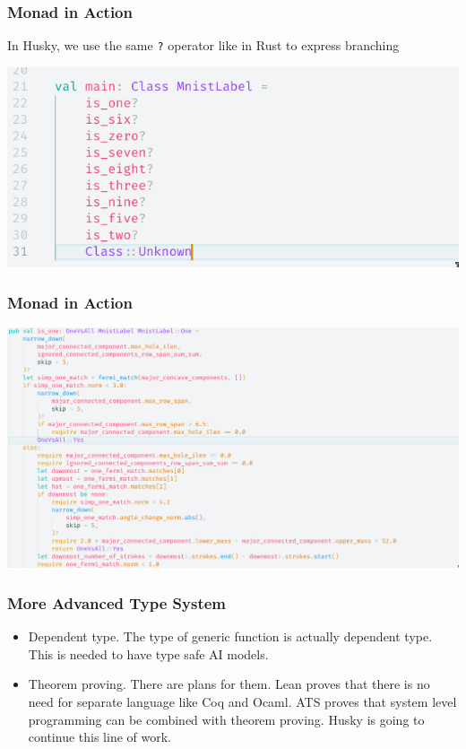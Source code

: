 \documentclass{beamer}   	%
\theoremstyle{definition}
\newcommand{\rust}[1]{\texttt{#1}}
\begin{document}
\begin{frame}
\frametitle{Monad in Action}

In Husky, we use the same \rust{?} operator like in Rust to express branching

\includegraphics[width=\linewidth]{snapshots/husky_mnist_classifier_main.png}
\end{frame}

\begin{frame}
\frametitle{Monad in Action}
\includegraphics[width=\linewidth]{snapshots/husky_mnist_classifier_is_one.png}
\end{frame}

\begin{frame}
\frametitle{More Advanced Type System}
\begin{itemize}
	\item Dependent type. The type of generic function is actually dependent type. This is needed to have type safe AI models.
	\item Theorem proving. There are plans for them. Lean proves that there is no need for separate language like Coq and Ocaml. ATS proves that system level programming can be combined with theorem proving. Husky is going to continue this line of work.
\end{itemize}
\end{frame}
\end{document}
